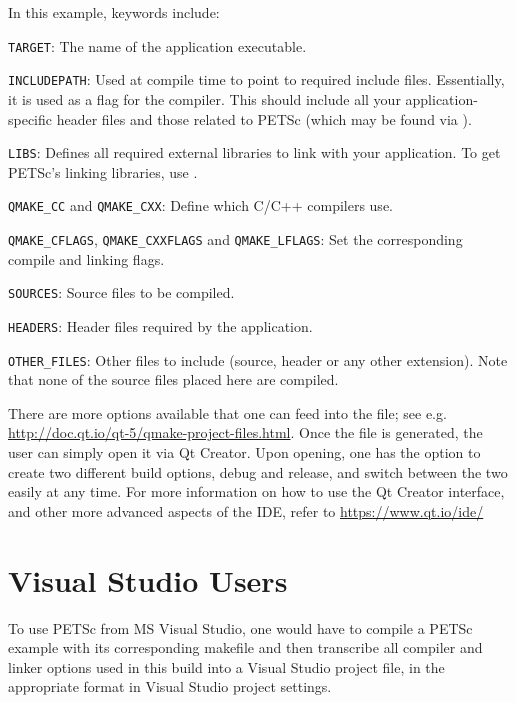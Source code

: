 {{In this example, keywords include:
\begin{tightitemize}
\item \lstinline{TARGET}: The name of the application executable.
\item \lstinline{INCLUDEPATH}: Used at compile time to point to required include files. Essentially, it is used as a  flag for the compiler. This should include all your application-specific header files and those related to PETSc (which may be found via ).
\item \lstinline{LIBS}: Defines all required external libraries to link with your application. To get PETSc's linking libraries, use .
\item \lstinline{QMAKE_CC} and \lstinline{QMAKE_CXX}: Define which C/C++ compilers use.
\item \lstinline{QMAKE_CFLAGS}, \lstinline{QMAKE_CXXFLAGS} and \lstinline{QMAKE_LFLAGS}: Set the corresponding compile and linking flags.
\item \lstinline{SOURCES}: Source files to be compiled.
\item \lstinline{HEADERS}: Header files required by the application. 
\item \lstinline{OTHER_FILES}: Other files to include (source, header or any other extension). Note that none of the source files placed here are compiled.
\end{tightitemize}

There are more options available that one can feed into the  file; see e.g. \url{http://doc.qt.io/qt-5/qmake-project-files.html}. 
Once the  file is generated, the user can simply open it via Qt Creator. 
Upon opening, one has the option to create two different build options, debug and release, and switch between the two easily at any time. 
For more information on how to use the Qt Creator interface, and other more advanced aspects of the IDE, refer to \url{https://www.qt.io/ide/}

\section{Visual Studio Users} 

To use PETSc from MS Visual Studio, one would have to compile a PETSc example with its corresponding makefile and then transcribe all compiler and linker options used in this build into a Visual Studio project file, in the appropriate format in Visual Studio project settings. 

}}
